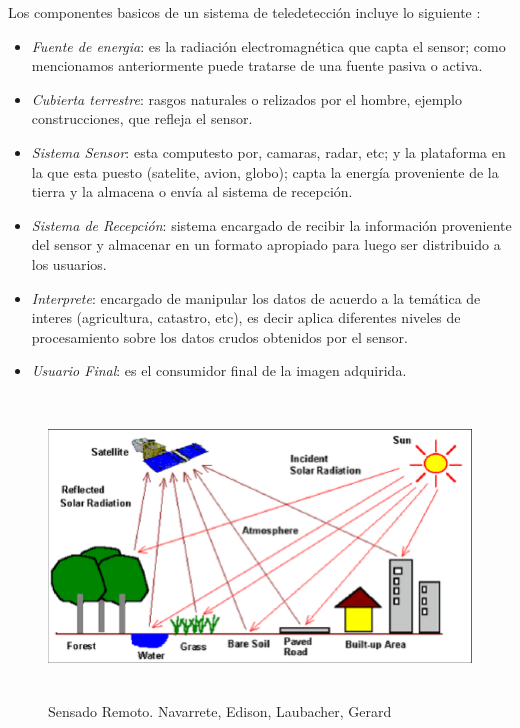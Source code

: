 Los componentes basicos de un sistema de teledetección incluye lo siguiente \citep{chuvieco}:
\begin{itemize}
\item \textit{Fuente de energia}: es la radiación electromagnética que capta el sensor; como mencionamos anteriormente puede tratarse de una fuente pasiva o activa.

\item \textit{Cubierta terrestre}: rasgos naturales o relizados por el hombre, ejemplo construcciones, que refleja el sensor.

\item \textit{Sistema Sensor}: esta computesto por, camaras, radar, etc; y la plataforma en la que esta puesto (satelite, avion, globo);  capta la energía proveniente de la tierra y la almacena o envía al sistema de recepción.

\item \textit{Sistema de Recepción}: sistema encargado de recibir la información proveniente del sensor y almacenar en un formato apropiado para luego ser distribuido a los usuarios.

\item \textit{Interprete}: encargado de manipular los datos de acuerdo a la temática de interes (agricultura, catastro, etc), es decir aplica diferentes niveles de procesamiento sobre los datos crudos obtenidos por el sensor.

\item \textit{Usuario Final}: es el consumidor final de la imagen adquirida.
\end{itemize}

\begin{figure}[H] \centering
  \includegraphics[height=8cm,keepaspectratio=true,clip=true]{imagenes/MarcoTeorico/teledeteccion.png}
  \caption{Sensado Remoto. Navarrete, Edison, Laubacher, Gerard}\label{Fig:teledeteccion}
\end{figure}

